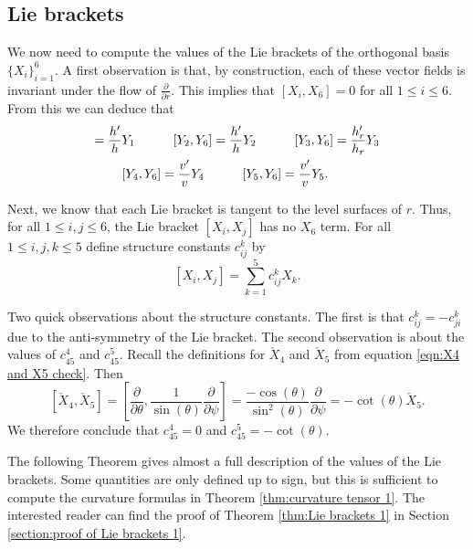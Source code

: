 \documentclass[10pt]{amsart}
\def\ddt{\frac{\partial}{\partial \theta}}
\def\ddr{\frac{\partial}{\partial r}}
\def\th{\theta}
\def\dds{\frac{\partial}{\partial \psi}}
\theoremstyle{definition}
\theoremstyle{remark}
\numberwithin{equation}{section}
\begin{document}
	
	
\subsection{Lie brackets}
We now need to compute the values of the Lie brackets of the orthogonal basis $\{ X_i \}_{i=1}^6$.  
A first observation is that, by construction, each of these vector fields is invariant under the flow of $\ddr$.  
This implies that $[X_i, X_6] = 0$ for all $1 \leq i \leq 6$.  
From this we can deduce that
	\begin{align*}
	[Y_1,Y_6] = \frac{h'}{h} &Y_1	 \hskip 30pt	[Y_2,Y_6] = \frac{h'}{h} Y_2	\hskip 30pt	[Y_3,Y_6] = \frac{h_r'}{h_r} Y_3  \\
		&[Y_4,Y_6] = \frac{v'}{v} Y_4	\hskip 30pt	[Y_5,Y_6] = \frac{v'}{v} Y_5.
	\end{align*}
	
Next, we know that each Lie bracket is tangent to the level surfaces of $r$.  
Thus, for all $1 \leq i, j \leq 6$, the Lie bracket $[X_i, X_j]$ has no $X_6$ term.  
For all $1 \leq i, j, k \leq 5$ define structure constants $c_{ij}^k$ by
	\begin{equation}\label{eqn:structure constants 1}
	[X_i, X_j] = \sum_{k = 1}^5 c_{ij}^k X_k.
	\end{equation}
	
Two quick observations about the structure constants.  
The first is that $c_{ij}^k = - c_{ji}^k$ due to the anti-symmetry of the Lie bracket.  
The second observation is about the values of $c_{45}^4$ and $c_{45}^5$.  
Recall the definitions for $\check{X}_4$ and $\check{X}_5$ from equation \eqref{eqn:X4 and X5 check}.
Then
	\begin{equation}\label{eqn:first Lie bracket 1}
	\left[ \check{X}_4, \check{X}_5 \right] = \left[ \ddt, \frac{1}{\sin (\th)} \dds \right] = \frac{- \cos (\th)}{\sin^2 (\th)} \dds = - \cot (\th) \check{X}_5.
	\end{equation}
We therefore conclude that $c_{45}^4 = 0$ and $c_{45}^5 = - \cot(\th)$.

The following Theorem gives almost a full description of the values of the Lie brackets.  
Some quantities are only defined up to sign, but this is sufficient to compute the curvature formulas in Theorem \ref{thm:curvature tensor 1}.
The interested reader can find the proof of Theorem \ref{thm:Lie brackets 1} in Section \ref{section:proof of Lie brackets 1}.  

\vskip 15pt
\end{document}
